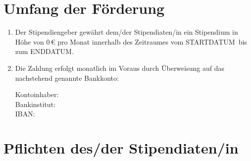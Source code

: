 \documentclass[
  paper=a4,
  fontsize=12pt,
  DIV=16,
  parskip=full,
  headinclude=true,
]{scrartcl}
\newcommand\stipbetrag{0}		%
\newcommand\stipstart{STARTDATUM}	%
\newcommand\stipende{ENDDATUM}		%
\newcommand\stipkontoinhaber{}		%
\newcommand\stipbank{}			%
\newcommand\stipiban{}			%
\begin{document}
\section{Umfang der Förderung}

\begin{enumerate}[\qquad(1)]
	\item Der Stipendiengeber gewährt dem/der Stipendiaten/in ein
		Stipendium in Höhe von \num{\stipbetrag}\,€ pro Monat innerhalb
		des Zeitraumes vom \stipstart\ bis zum \stipende.
	\item Die Zahlung erfolgt monatlich im Voraus durch Überweisung auf
		das nachstehend genannte Bankkonto:

		Kontoinhaber:\stipkontoinhaber\\
		Bankinstitut:\stipbank\\
		IBAN:\stipiban\\
\end{enumerate}

\section{Pflichten des/der Stipendiaten/in}
\end{document}

